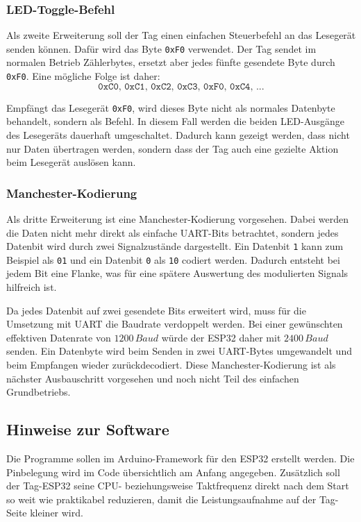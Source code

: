 \subsubsection{LED-Toggle-Befehl}
Als zweite Erweiterung soll der Tag einen einfachen Steuerbefehl an das Lesegerät senden können. Dafür wird das Byte \texttt{0xF0} verwendet. Der Tag sendet im normalen Betrieb Zählerbytes, ersetzt aber jedes fünfte gesendete Byte durch \texttt{0xF0}. Eine mögliche Folge ist daher:
\[
\texttt{0xC0,\ 0xC1,\ 0xC2,\ 0xC3,\ 0xF0,\ 0xC4,\ ...}
\]

Empfängt das Lesegerät \texttt{0xF0}, wird dieses Byte nicht als normales Datenbyte behandelt, sondern als Befehl. In diesem Fall werden die beiden LED-Ausgänge des Lesegeräts dauerhaft umgeschaltet. Dadurch kann gezeigt werden, dass nicht nur Daten übertragen werden, sondern dass der Tag auch eine gezielte Aktion beim Lesegerät auslösen kann.

\subsubsection{Manchester-Kodierung}
Als dritte Erweiterung ist eine Manchester-Kodierung vorgesehen. Dabei werden die Daten nicht mehr direkt als einfache UART-Bits betrachtet, sondern jedes Datenbit wird durch zwei Signalzustände dargestellt. Ein Datenbit \texttt{1} kann zum Beispiel als \texttt{01} und ein Datenbit \texttt{0} als \texttt{10} codiert werden. Dadurch entsteht bei jedem Bit eine Flanke, was für eine spätere Auswertung des modulierten Signals hilfreich ist.

Da jedes Datenbit auf zwei gesendete Bits erweitert wird, muss für die Umsetzung mit UART die Baudrate verdoppelt werden. Bei einer gewünschten effektiven Datenrate von $1200\,Baud$ würde der ESP32 daher mit $2400\,Baud$ senden. Ein Datenbyte wird beim Senden in zwei UART-Bytes umgewandelt und beim Empfangen wieder zurückdecodiert. Diese Manchester-Kodierung ist als nächster Ausbauschritt vorgesehen und noch nicht Teil des einfachen Grundbetriebs.

\subsection{Hinweise zur Software}
Die Programme sollen im Arduino-Framework für den ESP32 erstellt werden. Die Pinbelegung wird im Code übersichtlich am Anfang angegeben. Zusätzlich soll der Tag-ESP32 seine CPU- beziehungsweise Taktfrequenz direkt nach dem Start so weit wie praktikabel reduzieren, damit die Leistungsaufnahme auf der Tag-Seite kleiner wird.

